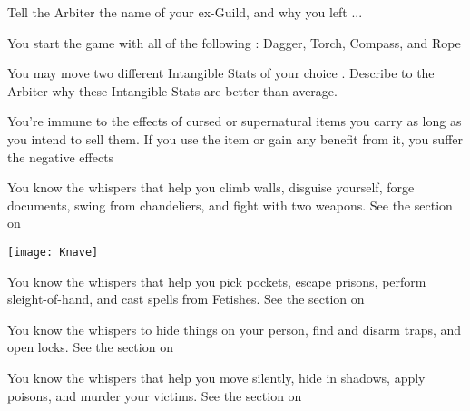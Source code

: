     Tell the Arbiter the name of your ex-Guild, and why you left ...    



    You start the game with all of the following :  Dagger, Torch, Compass, and Rope



    You may move two different Intangible Stats of your choice \DCUP.  Describe to the Arbiter why these Intangible Stats are better than average.


    You're immune to the effects of cursed or supernatural items you carry as long as you intend to sell them.  If you use the item or gain any benefit from it, you suffer the negative effects    


    You know the whispers that help you climb walls, disguise yourself, forge documents, swing from chandeliers, and fight with two weapons.  See the section on 

   \begin{center}
      \texttt{[image: Knave]}
    \end{center}



    You know the whispers that help you pick pockets, escape prisons, perform sleight-of-hand, and cast spells from Fetishes.  See the section on 


    You know the whispers to hide things on your person, find and disarm traps, and open locks.   See the section on 


    You know the whispers that help you move silently, hide in shadows, apply poisons, and murder your victims.   See the section on 

 



